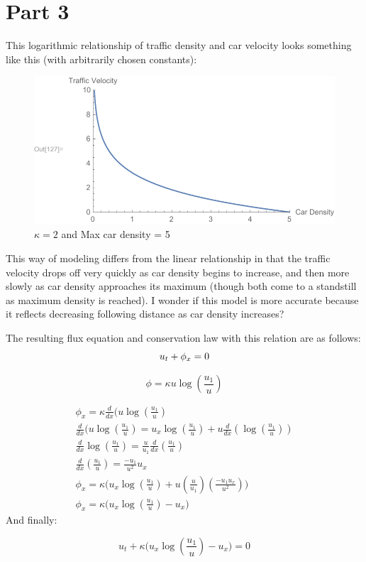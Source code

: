 \documentclass{article}
\begin{document}
\section*{Part 3}
This logarithmic relationship of traffic density and car velocity looks something like this (with arbitrarily chosen constants):
\begin{figure}[H]
  \centering
    \includegraphics[width=\textwidth]{plot1.pdf}
    \caption{$\kappa = 2$ and Max car density = 5}
\end{figure}
This way of modeling differs from the linear relationship in that the traffic velocity drops off very quickly as car density begins to increase, and then more slowly as car density approaches its maximum (though both come to a standstill as maximum density is reached). I wonder if this model is more accurate because it reflects decreasing following distance as car density increases?

The resulting flux equation and conservation law with this relation are as follows:
\begin{equation}
u_t + \phi_x = 0\\
\end{equation}
\begin{tcolorbox}[minipage,colback=white,arc=0pt,outer arc=0pt]
\begin{equation}
\phi = \kappa u  \log(\frac{u_1}{u})
\end{equation}
\end{tcolorbox}
\begin{equation}
\begin{aligned}
\phi_x = \kappa\frac{d}{dx}(u\log(\frac{u_1}{u})\\
\frac{d}{dx}(u\log(\frac{u_1}{u}) = u_x\log(\frac{u_1}{u}) + u\frac{d}{dx}(\log(\frac{u_1}{u}))\\
\frac{d}{dx}\log(\frac{u_1}{u}) = \frac{u}{u_1}\frac{d}{dx}(\frac{u_1}{u})\\
\frac{d}{dx}(\frac{u_1}{u}) = \frac{-u_1}{u^2}u_x\\
\phi_x = \kappa \Big( u_x\log(\frac{u_1}{u}) + u (\frac{u}{u_1})(\frac{-u_1u_x}{u^2})\Big) \\
\phi_x = \kappa \Big( u_x\log(\frac{u_1}{u}) - u_x \Big)
\end{aligned}
\end{equation}
And finally:
\begin{tcolorbox}[minipage,colback=white,arc=0pt,outer arc=0pt]
\begin{equation}
u_t + \kappa \Big( u_x\log(\frac{u_1}{u}) - u_x \Big) = 0
\end{equation}
\end{tcolorbox}
\end{document}
